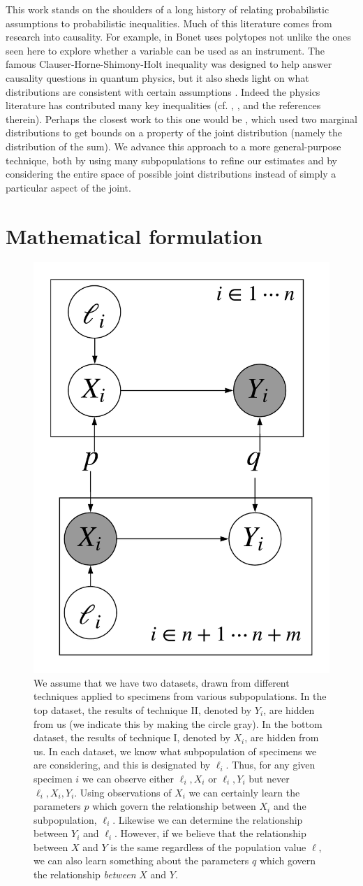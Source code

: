 This work stands on the shoulders of a long history of relating probabilistic assumptions to probabilistic inequalities.  Much of this literature comes from research into causality.  For example, in \cite{bonet2001instrumentality} Bonet uses polytopes not unlike the ones seen here to explore whether a variable can be used as an instrument.  The famous Clauser-Horne-Shimony-Holt inequality was designed to help answer causality questions in quantum physics, but it also sheds light on what distributions are consistent with certain assumptions \cite{clauser1969proposed}.  Indeed the physics literature has contributed many key inequalities (cf. \cite{chaves2014inferring}, \cite{kela2017semidefinite}, and the references therein).  Perhaps the closest work to this one would be \cite{makarov1982estimates}, which used two marginal distributions to get bounds on a property of the joint distribution (namely the distribution of the sum).  We advance this approach to a more general-purpose technique, both by using many subpopulations to refine our estimates and by considering the entire space of possible joint distributions instead of simply a particular aspect of the joint.  

\section{Mathematical formulation}

\begin{figure}
\hfill{}\includegraphics[width=.3\textwidth]{pics/plate}\hfill{}
\caption{We assume that we have two datasets, drawn from different techniques applied to specimens from various subpopulations.  In the top dataset, the results of technique II, denoted by $Y_i$, are hidden from us (we indicate this by making the circle gray).  In the bottom dataset, the results of technique I, denoted by $X_i$, are hidden from us.  In each dataset, we know what subpopulation of specimens we are considering, and this is designated by $\ell_i$.  Thus, for any given specimen $i$ we can observe either $\ell_i,X_i$ or $\ell_i,Y_i$ but never $\ell_i,X_i,Y_i$.  Using observations of $X_i$ we can certainly learn the parameters $p$ which govern the relationship between $X_i$ and the subpopulation, $\ell_i$.  Likewise we can determine the relationship between $Y_i$ and $\ell_i$.  However, if we believe that the relationship between $X$ and $Y$ is the same regardless of the population value $\ell$, we can also learn something about the parameters $q$ which govern the relationship \emph{between} $X$ and $Y$.\label{fig:plate}}
\end{figure}

